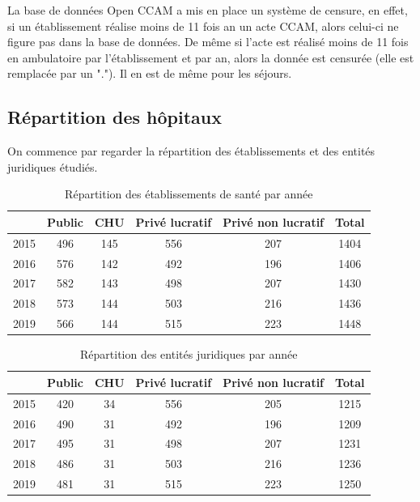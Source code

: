 \bigskip

La base de données Open CCAM a mis en place un système de censure, en effet, si un établissement réalise moins de 11 fois an un acte CCAM, alors celui-ci ne figure pas dans la base de données. De même si l'acte est réalisé moins de 11 fois en ambulatoire par l'établissement et par an, alors la donnée est censurée (elle est remplacée par un "."). Il en est de même pour les séjours.

\clearpage


\subsection{Répartition des hôpitaux}

On commence par regarder la répartition des établissements et des entités juridiques étudiés.\\

\begin{table}[ht]
\centering
\caption{Répartition des établissements de santé par année} 
\label{tri_eta}
\begin{tabular}{r|cccc|c}
  \hline
& Public & CHU & Privé lucratif & Privé non lucratif & Total\\ 
  \hline
2015 & 496 & 145 & 556 & 207 & 1404\\ 
  2016 & 576 & 142 & 492 & 196 & 1406 \\ 
  2017 & 582 & 143 & 498 & 207 & 1430 \\ 
  2018 & 573 & 144 & 503 & 216 & 1436\\ 
  2019 & 566 & 144 & 515 & 223 & 1448\\ 
   \hline
\end{tabular}
\end{table}

\bigskip

\begin{table}[ht]
\centering
\caption{Répartition des entités juridiques par année}
\label{tri_ej}
\begin{tabular}{r|cccc|c}
  \hline
 & Public & CHU & Privé lucratif & Privé non lucratif & Total \\ 
  \hline
2015 & 420 &  34 & 556 & 205 & 1215\\ 
  2016 & 490 &  31 & 492 & 196 & 1209\\ 
  2017 & 495 &  31 & 498 & 207 & 1231\\ 
  2018 & 486 &  31 & 503 & 216 & 1236\\ 
  2019 & 481 &  31 & 515 & 223 & 1250\\ 
   \hline
\end{tabular} 
\end{table}

